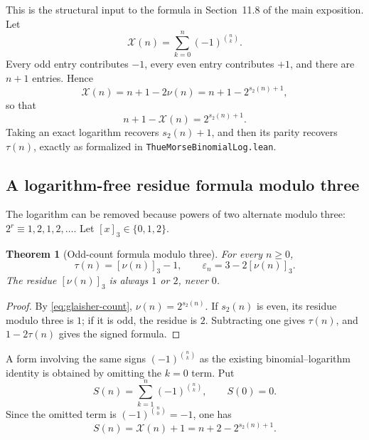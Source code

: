 \documentclass[11pt,oneside]{article}
\newtheorem{theorem}{Theorem}[section]
\theoremstyle{definition}
\theoremstyle{remark}
\newcommand{\bitsum}{s_2}
\newcommand{\eps}{\varepsilon}
\newcommand{\res}[2]{\left[#1\right]_{#2}}
\newcommand{\lean}[1]{%
  \ifmmode\text{\nolinkurl{#1}}\else\nolinkurl{#1}\fi}
\begin{document}
This is the structural input to the formula in Section~11.8 of the main
exposition.  Let
\begin{equation}
  \mathcal X(n)=\sum_{k=0}^{n}(-1)^{\binom nk}.
  \label{eq:X-definition}
\end{equation}
Every odd entry contributes \(-1\), every even entry contributes \(+1\), and
there are \(n+1\) entries.  Hence
\begin{equation}
  \mathcal X(n)=n+1-2\nu(n)
               =n+1-2^{\bitsum(n)+1},
  \label{eq:X-exact}
\end{equation}
so that
\begin{equation}
  n+1-\mathcal X(n)=2^{\bitsum(n)+1}.
  \label{eq:X-power-two}
\end{equation}
Taking an exact logarithm recovers \(\bitsum(n)+1\), and then its parity
recovers \(\tau(n)\), exactly as formalized in
\lean{ThueMorseBinomialLog.lean}.

\subsection{A logarithm-free residue formula modulo three}
\label{sec:mod-three}

The logarithm can be removed because powers of two alternate modulo three:
\(2^r\equiv1,2,1,2,\ldots\).  Let \(\res{x}{3}\in\{0,1,2\}\).

\begin{theorem}[Odd-count formula modulo three]
For every \(n\ge0\),
\begin{equation}
  \boxed{
  \tau(n)=\res{\nu(n)}{3}-1,
  \qquad
  \eps_n=3-2\res{\nu(n)}{3}.}
  \label{eq:odd-count-mod3}
\end{equation}
The residue \(\res{\nu(n)}{3}\) is always \(1\) or \(2\), never \(0\).
\end{theorem}

\begin{proof}
By \eqref{eq:glaisher-count}, \(\nu(n)=2^{\bitsum(n)}\).  If
\(\bitsum(n)\) is even, its residue modulo three is \(1\); if it is odd, the
residue is \(2\).  Subtracting one gives \(\tau(n)\), and
\(1-2\tau(n)\) gives the signed formula.
\end{proof}

A form involving the same signs \((-1)^{\binom nk}\) as the existing
binomial--logarithm identity is obtained by omitting the \(k=0\) term.  Put
\begin{equation}
  S(n)=\sum_{k=1}^{n}(-1)^{\binom nk},
  \qquad S(0)=0.
  \label{eq:S-definition}
\end{equation}
Since the omitted term is \((-1)^{\binom n0}=-1\), one has
\begin{equation}
  S(n)=\mathcal X(n)+1=n+2-2^{\bitsum(n)+1}.
  \label{eq:S-exact}
\end{equation}
\end{document}
